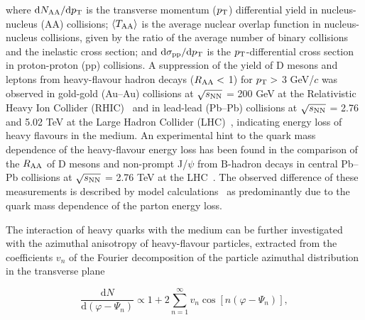 \documentclass[11pt,a4paper]{article}
\providecommand{\raa}{$R_{\rm{\rm AA}}$ }
\providecommand{\vn}{$v_{n}$ }
\providecommand{\snn}{$\sqrt{s_{\rm NN}}$ }
\begin{document}
\noindent where $\mathrm{d}N_{\rm{AA}}/\mathrm{d}p_{\rm T}$ is the transverse momentum ($p_{\rm T}$) differential yield in nucleus-nucleus (AA) collisions; $ \langle T_{\rm{AA}} \rangle$ is the average nuclear overlap function in nucleus-nucleus collisions, given by the ratio of the average number of binary collisions and the inelastic cross section; and  
$\mathrm{d}\sigma_{\mathrm{pp}}/\mathrm{d}p_{\rm T}$  is the $p_{\rm T}$-differential cross section in proton-proton (pp) collisions. 
A suppression of the yield of $\mathrm{D}$ mesons and leptons from heavy-flavour hadron decays    ($R_{\rm AA}<$ 1) for $p_{\rm T} > $ 3 GeV/$c$ was observed in gold-gold (Au--Au) collisions at \snn = 200 GeV at the Relativistic Heavy Ion Collider (RHIC)~\cite{STARRaaeAuAu,STARRaaD0AuAu,PHENIXRaaeAuAu,PHENIXRaaeAuAubis} and in lead-lead (Pb--Pb) collisions at \snn = 2.76 and 5.02 TeV at the Large Hadron Collider (LHC)~\cite{ALICEDRPbPb,ALICEDRPbPbcent,ALICEmuRPbPb,CMSD0Raa,Adam:2016wyz,HFERAA,ATLAS-CONF-2015-053}, indicating energy loss of heavy flavours in the medium. 
An experimental hint to the quark mass dependence of the heavy-flavour energy loss has been found in the comparison of the \raa of $\mathrm{D}$ mesons and non-prompt J/$\psi$ from $\mathrm{B}$-hadron decays in central Pb--Pb collisions at \snn = 2.76 TeV at the LHC~\cite{ALICEDRPbPbcent,CMSnpjpsi,Khachatryan:2016ypw}.  The observed difference of these measurements is described by model calculations~\cite{Djordjevic2014298,Andronic:2015wma} as predominantly due to the quark mass dependence of the parton energy loss.

The interaction of heavy quarks with the medium can be further investigated with the  azimuthal anisotropy of  heavy-flavour particles, extracted from the coefficients \vn of the Fourier decomposition of the particle azimuthal distribution in the transverse plane~\cite{PhysRevC.58.1671}

\begin{equation}
\frac{\mathrm{d}N}{\mathrm{d}\left( \varphi - \Psi_{n} \right) } \propto  1+ 2 \sum_{n=1}^{\infty}  v_{n}\cos\left[n\left( \varphi - \Psi_{n} \right)\right],
\label{eq:FourierSeries}
\end{equation}   
\end{document}
